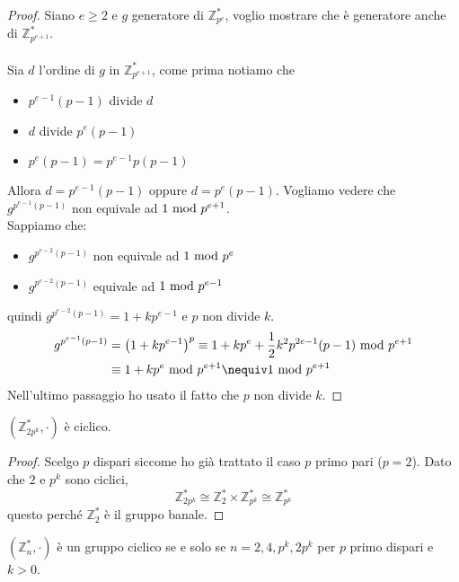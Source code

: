 \begin{proof}
	Siano $e\geq2$ e $g$ generatore di $\mathbb{Z}_{p^e}^*$, voglio mostrare che è generatore anche di $\mathbb{Z}_{p^{e+1}}^*$. \\ \\ Sia $d$ l'ordine di $g$ in $\mathbb{Z}_{p^{e+1}}^*$, come prima notiamo che 
	\begin{itemize}
		\item $p^{e-1}(p-1)$ divide $d$
		\item $d$ divide $p^e(p-1)$
		\item $p^e(p-1)=p^{e-1}p(p-1)$
	\end{itemize}
Allora $d=p^{e-1}(p-1)$ oppure $d=p^e(p-1)$. Vogliamo vedere che $g^{p^{e-1}(p-1)}$ non equivale ad $1\ \mathrm{mod}\ p^{e+1}$. \\ Sappiamo che:
\begin{itemize}
	\item $g^{p^{e-2}(p-1)}$ non equivale ad $1\ \mathrm{mod}\ p^e$
	\item $g^{p^{e-2}(p-1)}$ equivale ad $1\ \mathrm{mod}\ p^{e-1}$
\end{itemize}
quindi $g^{p^{e-2}(p-1)}=1+kp^{e-1}$ e $p$ non divide $k$.
\begin{align*}
g^{p^{e-1}(p-1)}&=\left(1+kp^{e-1}\right)^p\equiv 1+kp^e+\frac{1}{2}k^2p^{2e-1}(p-1)\Mod p^{e+1}\\
&\equiv 1+kp^e\Mod p^{e+1}\nequiv1\Mod p^{e+1}
\end{align*}
Nell'ultimo passaggio ho usato il fatto che $p$ non divide $k$.
\end{proof}
\begin{teorema}
	$\left(\mathbb{Z}_{2p^k}^*,\cdot\right)$ è ciclico.
\end{teorema}
\begin{proof}
	Scelgo $p$ dispari siccome ho già trattato il caso $p$ primo pari ($p=2$). Dato che $2$ e $p^k$ sono ciclici, 
	\begin{equation*}
	\mathbb{Z}_{2p^k}^*\cong \mathbb{Z}_{2}^*\times\mathbb{Z}_{p^k}^*\cong \mathbb{Z}_{p^k}^*
	\end{equation*}
	questo perché $\mathbb{Z}_{2}^*$ è il gruppo banale.
\end{proof}
\begin{teorema}
	$\left(\mathbb{Z}_{n}^*,\cdot\right)$ è un gruppo ciclico se e solo se $n=2,4,p^k,2p^k$ per $p$ primo dispari e $k>0$.
\end{teorema}

